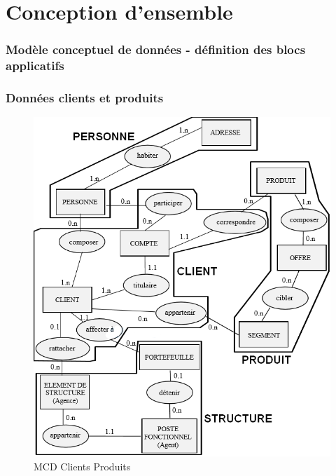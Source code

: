 \part{Conception d'ensemble}
\setcounter{section}{0}

\section{Modèle conceptuel de données - définition des blocs applicatifs} 

\section{Données clients et produits} 


\begin{figure}[H]
\centering
\includegraphics[width=\textwidth]{figures/mcd/MCD_Clients_Produits}
\caption{MCD Clients Produits}
\end{figure}


